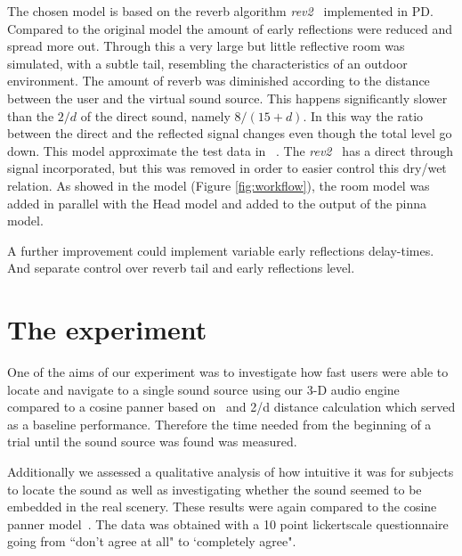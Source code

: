 \documentclass[journal]{IEEEtran}
\begin{document}
The chosen model is based on the reverb algorithm \textit{rev2~} implemented in PD. Compared to the original model the amount of early reflections were reduced and spread more out. Through this a very large but little reflective room was simulated, with a subtle tail, resembling the characteristics of an outdoor environment. The amount of reverb was diminished according to the distance between the user and the virtual sound source. This happens significantly slower than the $2/d$ of the direct sound, namely $8/(15+d)$. In this way the ratio between the direct and the reflected signal changes even though the total level go down. This model approximate the test data in ~\cite{begault19943}. The \textit{rev2~} has a direct through signal incorporated, but this was removed in order to easier control this dry/wet relation. As showed in the model (Figure \ref{fig:workflow}), the room model was added in parallel with the Head model and added to the output of the pinna model. 

A further improvement could implement variable early reflections delay-times. And separate control over reverb tail and early reflections level.

\section{The experiment}
One of the aims of our experiment was to investigate how fast users were able to locate and navigate to a single sound source using our 3-D audio engine compared to a cosine panner based on~\cite{AndyFarnell2010} and 2/d distance calculation which served as a baseline performance. Therefore the time needed from the beginning of a trial until the sound source was found was measured. 

Additionally we assessed a qualitative analysis of how intuitive it was for subjects to locate the sound as well as investigating whether the sound seemed to be embedded in the real scenery. These results were again compared to the cosine panner model~\cite{AndyFarnell2010}. The data was obtained with a 10 point lickertscale questionnaire going from ``don't agree at all" to `completely agree".
\end{document}
